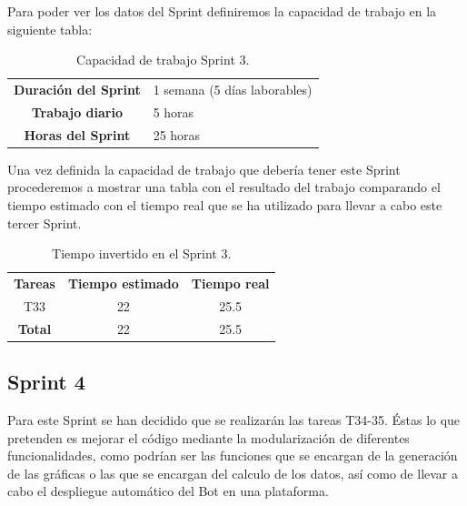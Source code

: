 Para poder ver los datos del Sprint definiremos la capacidad de trabajo en la siguiente tabla:

\begin{table}[H]
	\begin{center}
		\begin{tabular}{| c | p{9cm} |}
			\hline
			
			\textbf{Duración del Sprint} & 1 semana (5 días laborables) \\
			\textbf{Trabajo diario} & 5 horas \\
			\textbf{Horas del Sprint} & 25 horas \\ \hline
		\end{tabular}
		\caption{Capacidad de trabajo Sprint 3.}

	\end{center}
\end{table}

Una vez definida la capacidad de trabajo que debería tener este Sprint procederemos a mostrar una tabla con el resultado del trabajo comparando el tiempo estimado con el tiempo real que se ha utilizado para llevar a cabo este tercer Sprint.

\begin{table}[H]
	\begin{center}
		\begin{tabular}{| c | c | c |}
			\hline
			
			\textbf{Tareas} & \textbf{Tiempo estimado} & \textbf{Tiempo real} \\
			T33 & 22 & 25.5 \\
			\textbf{Total} & 22 & 25.5 \\ \hline
		\end{tabular}
		\caption{Tiempo invertido en el Sprint 3.}
	\end{center}
\end{table}

\subsection{Sprint 4}

Para este Sprint se han decidido que se realizarán las tareas T34-35. Éstas lo que pretenden es mejorar el código mediante la modularización de diferentes funcionalidades, como podrían ser las funciones que se encargan de la generación de las gráficas o las que se encargan del calculo de los datos, así como de llevar a cabo el despliegue automático del Bot en una plataforma.

